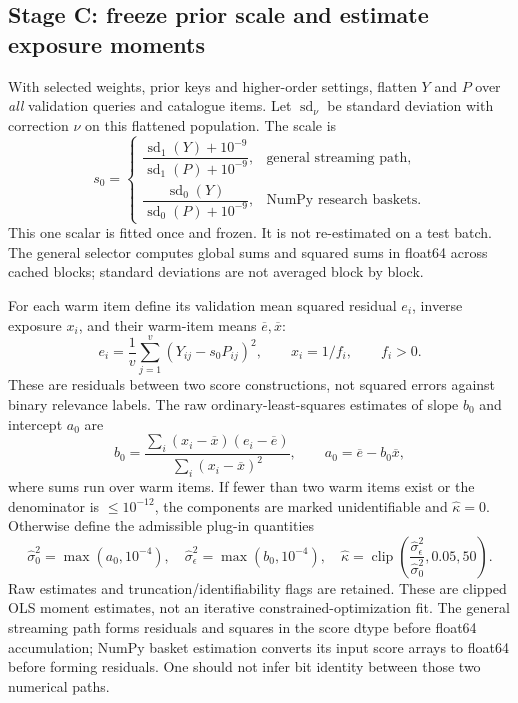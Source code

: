 \documentclass[11pt,a4paper]{article}
\numberwithin{equation}{section}
\begin{document}
\subsection{Stage C: freeze prior scale and estimate exposure moments}\label{sec:moments}
With selected weights, prior keys and higher-order settings, flatten $Y$ and $P$ over
\emph{all} validation queries and catalogue items. Let $\operatorname{sd}_\nu$ be standard
deviation with correction $\nu$ on this flattened population. The scale is
\begin{equation}
 s_0=\begin{cases}
 \dfrac{\operatorname{sd}_1(Y)+10^{-9}}
       {\operatorname{sd}_1(P)+10^{-9}},&\text{general streaming path},\\[6pt]
 \dfrac{\operatorname{sd}_0(Y)}
       {\operatorname{sd}_0(P)+10^{-9}},&\text{NumPy research baskets}.
 \end{cases}
\end{equation}
This one scalar is fitted once and frozen. It is not re-estimated on a test batch.
The general selector computes global sums and squared sums in float64 across cached
blocks; standard deviations are not averaged block by block.

For each warm item define its validation mean squared residual $e_i$, inverse exposure
$x_i$, and their warm-item means $\overline e,\overline x$:
\begin{equation}
 e_i=\frac1v\sum_{j=1}^v(Y_{ij}-s_0P_{ij})^2,
 \qquad x_i=1/f_i,\qquad f_i>0.
\end{equation}
These are residuals between two score constructions, not squared errors against binary
relevance labels. The raw ordinary-least-squares estimates of slope $b_0$ and intercept
$a_0$ are
\begin{equation}
 b_0=\frac{\sum_i(x_i-\overline x)(e_i-\overline e)}
            {\sum_i(x_i-\overline x)^2},\qquad
 a_0=\overline e-b_0\overline x,
\end{equation}
where sums run over warm items. If fewer than two warm items exist or the denominator is
$\le10^{-12}$, the components are marked unidentifiable and $\widehat\kappa=0$.
Otherwise define the admissible plug-in quantities
\begin{equation}
 \widehat\sigma_0^2=\max(a_0,10^{-4}),\quad
 \widehat\sigma_\epsilon^2=\max(b_0,10^{-4}),\quad
 \widehat\kappa=\operatorname{clip}
 \left(\frac{\widehat\sigma_\epsilon^2}{\widehat\sigma_0^2},0.05,50\right).
\end{equation}
Raw estimates and truncation/identifiability flags are retained. These are clipped OLS
moment estimates, not an iterative constrained-optimization fit. The general streaming
path forms residuals and squares in the score dtype before float64 accumulation; NumPy
basket estimation converts its input score arrays to float64 before forming residuals.
One should not infer bit identity between those two numerical paths.
\end{document}
